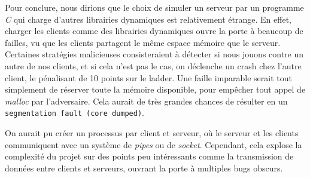 Pour conclure, nous dirions que le choix de simuler un serveur par un programme \textit{C} qui
charge d'autres librairies dynamiques est relativement étrange. En effet, charger les clients comme des 
librairies dynamiques ouvre la porte à beaucoup de failles, vu que les clients partagent le même espace mémoire que le serveur.
Certaines stratégies malicieuses consisteraient à détecter si nous jouons contre un autre de nos clients, et si cela n'est pas le cas,
on déclenche un crash chez l'autre client, le pénalisant de 10 points sur le ladder. Une faille imparable
serait tout simplement de réserver toute la mémoire disponible, pour empêcher tout appel de \textit{malloc} par l'adversaire.
Cela aurait de très grandes chances de résulter en un \verb|segmentation fault (core dumped)|.

On aurait pu créer un processus par client et serveur, où le serveur et 
les clients communiquent avec un système de \textit{pipes} ou de \textit{socket}.
Cependant, cela explose la complexité du projet sur des points peu intéressants comme 
la transmission de données entre clients et serveurs, ouvrant la porte à multiples bugs obscurs.